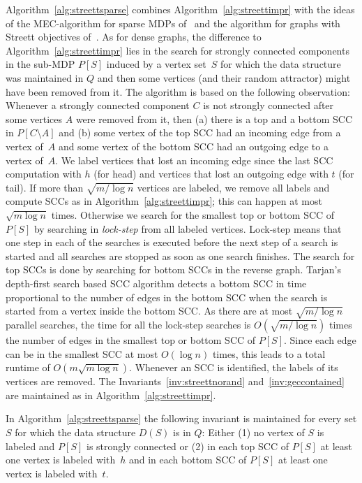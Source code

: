 \documentclass[11pt,letterpaper]{article}
\newcommand{\lu}{\textup{(}}
\newcommand{\ru}{\textup{)}\xspace}
\newcommand{\upbr}[1]{\lu #1\ru}
\newcommand{\mdp}{P\xspace}
\newcommand{\scc}{C\xspace}
\newcommand{\ds}{\mathit{D}\xspace}
\begin{document}
Algorithm~\ref{alg:streettsparse} combines Algorithm~\ref{alg:streettimpr}
with the ideas of the MEC-algorithm for sparse MDPs of~\cite{ChatterjeeH14} and 
the algorithm for graphs with Streett objectives of~\cite{HenzingerT96}.
As for dense graphs, the difference to
Algorithm~\ref{alg:streettimpr} lies in the search for strongly connected 
components in the sub-MDP $\mdp[S]$ induced by a vertex set~$S$ for which 
the data structure was maintained in $Q$ and then some vertices (and their 
random attractor) might have been removed from it. The algorithm is based 
on the following observation: Whenever a strongly connected component $\scc$
is not strongly connected after some vertices $A$ were removed from it,
then \upbr{a} there is a top and a bottom SCC in $\mdp[\scc \setminus A]$ and 
\upbr{b} some vertex of the top SCC had an incoming edge from a vertex of~$A$
and some vertex of the bottom SCC had an outgoing edge to a vertex of~$A$.
We label vertices that lost an incoming edge since the last SCC computation 
with $h$ (for head) and vertices that lost an outgoing edge with $t$ (for tail).
If more than $\sqrt{m / \log n}$ vertices are labeled, we remove all labels and 
compute SCCs as in Algorithm~\ref{alg:streettimpr}; this can happen at most 
$\sqrt{m \log n}$ times. Otherwise we search for the smallest top or bottom SCC 
of $\mdp[S]$ by searching in \emph{lock-step} from all labeled vertices.
Lock-step means that one step in each of the searches is executed before 
the next step of a search is started and all searches are stopped as soon as 
one search finishes. The search for top SCCs is done by 
searching for bottom SCCs in the reverse graph. Tarjan's depth-first search 
based SCC algorithm detects a bottom SCC in time proportional to the number 
of edges in the bottom SCC when the search is started from a vertex inside
the bottom SCC. As there are at most $\sqrt{m / \log n}$ parallel searches,
the time for all the lock-step searches is $O(\sqrt{m / \log n})$ times the 
number of edges in the smallest top or bottom SCC of $\mdp[S]$. Since 
each edge can be in the smallest SCC at most $O(\log n)$ times, this leads to 
a total runtime of $O(m \sqrt{m \log n})$.
Whenever an SCC is identified, the labels of its vertices are removed. The 
Invariants~\ref{inv:streettnorand} and~\ref{inv:geccontained} are maintained
as in Algorithm~\ref{alg:streettimpr}.

\begin{lemma}\label{lem:streettsparselabel}
	In Algorithm~\ref{alg:streettsparse} the following invariant is maintained
	for every set $S$ for which the data structure $\ds(S)$ is in $Q$: 
	Either \upbr{1} no vertex of $S$ is labeled and $\mdp[S]$ is strongly connected or 
	\upbr{2} in each top SCC of $\mdp[S]$ at least one vertex is labeled with~$h$
	and in each bottom SCC of $\mdp[S]$ at least one vertex is labeled with~$t$.
\end{lemma}
\end{document}
